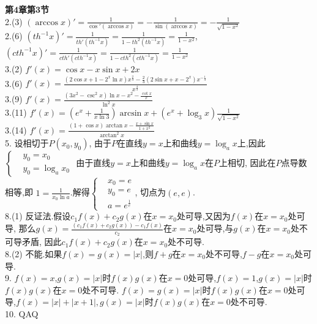 \documentclass[12pt, a4paper, oneside]{ctexart}
\begin{document}
    \textbf{第4章第3节}\\
    2.(3) $(\arccos x)'=\frac{1}{\cos'(\arccos x)}=-\frac{1}{\sin(\arccos x)}=-\frac{1}{\sqrt{1-x^2}}$\\
    2.(6) $(th^{-1}x)'=\frac{1}{th'(th^{-1}x)}=\frac{1}{1-th^2(th^{-1}x)}=\frac{1}{1-x^2}$,
    $(cth^{-1}x)'=\frac{1}{cth'(cth^{-1}x)}=\frac{1}{1-cth^2(cth^{-1}x)}=\frac{1}{1-x^2}$\\
    3.(2) $f'(x)=\cos x-x\sin x+2x$\\
    3.(6) $f'(x)=\frac{(2\cos x+1-2^x\ln x)x^{\frac23}-\frac23(2\sin x+x-2^x)x^{-\frac13}}{x^{\frac43}}$\\
    3.(9) $f'(x)=\frac{(3x^2-\csc^2x)\ln x-x^2-\frac{\cot x}{x}}{\ln^2x}$\\
    3.(11) $f'(x)=(e^x+\frac{1}{x\ln3})\arcsin x+(e^x+\log_3x)\frac{1}{\sqrt{1-x^2}}$\\
    3.(14) $f'(x)=\frac{(1+\cos x)\arctan x-\frac{x+\sin x}{1+x^2}}{\arctan^2x}$\\
    5. 设相切于$P(x_0,y_0)$, 由于$P$在直线$y=x$上和曲线$y=\log_ax$上,因此$\left\{\begin{aligned}&y_0=x_0\\&y_0=\log_ax_0\end{aligned}\right.$
    由于直线$y=x$上和曲线$y=\log_ax$在$P$上相切, 因此在$P$点导数相等,即 $1=\frac{1}{x_0\ln a}$.解得$\left\{\begin{aligned}&x_0=e\\&y_0=e\\&a=e^{\frac1e}\end{aligned}\right.$,
    切点为$(e,e)$.\\
    8.(1) 反证法.假设$c_1f(x)+c_2g(x)$在$x=x_0$处可导,又因为$f(x)$在$x=x_0$处可导,
    那么$g(x)=\frac{(c_1f(x)+c_2g(x))-c_1f(x)}{c_2}$在$x=x_0$处可导,与$g(x)$在$x=x_0$处不可导矛盾,
    因此$c_1f(x)+c_2g(x)$在$x=x_0$处不可导.\\
    8.(2) 不能.如果$f(x)=g(x)=|x|$,则$f+g$在$x=x_0$处不可导,$f-g$在$x=x_0$处可导.\\
    9. $f(x)=x$,$g(x)=|x|$时$f(x)g(x)$在$x=0$处可导,$f(x)=1$,$g(x)=|x|$时$f(x)g(x)$在$x=0$处不可导.
    $f(x)=g(x)=|x|$时$f(x)g(x)$在$x=0$处可导,$f(x)=|x|+|x+1|,g(x)=|x|$时$f(x)g(x)$在$x=0$处不可导.\\
    10. QAQ\\
    
\end{document}
